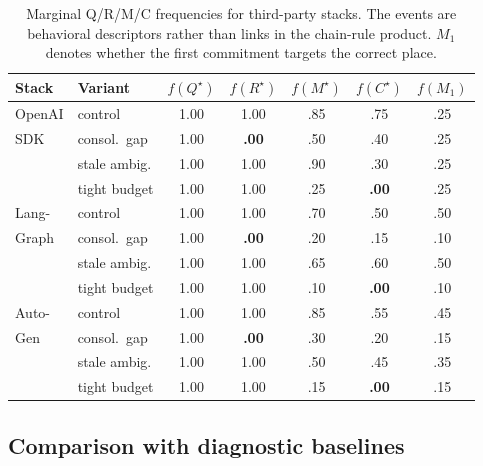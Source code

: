 \documentclass[letterpaper]{article}
\begin{document}
\begin{table}[h]
\caption{Marginal Q/R/M/C frequencies for third-party stacks. The events are behavioral descriptors rather than links in the chain-rule product. $M_1$ denotes whether the first commitment targets the correct place.}
\label{tab:external}
\centering
\small
\setlength{\tabcolsep}{3.4pt}
\begin{tabular}{llccccc}
\toprule
Stack & Variant & $f(Q^\star)$ & $f(R^\star)$ & $f(M^\star)$ & $f(C^\star)$ & $f(M_1)$ \\
\midrule
OpenAI & control      & 1.00 & 1.00 & .85 & .75 & .25 \\
SDK    & consol.\ gap & 1.00 & \textbf{.00} & .50 & .40 & .25 \\
       & stale ambig. & 1.00 & 1.00 & .90 & .30 & .25 \\
       & tight budget & 1.00 & 1.00 & .25 & \textbf{.00} & .25 \\
\midrule
Lang-  & control      & 1.00 & 1.00 & .70 & .50 & .50 \\
Graph  & consol.\ gap & 1.00 & \textbf{.00} & .20 & .15 & .10 \\
       & stale ambig. & 1.00 & 1.00 & .65 & .60 & .50 \\
       & tight budget & 1.00 & 1.00 & .10 & \textbf{.00} & .10 \\
\midrule
Auto-  & control      & 1.00 & 1.00 & .85 & .55 & .45 \\
Gen    & consol.\ gap & 1.00 & \textbf{.00} & .30 & .20 & .15 \\
       & stale ambig. & 1.00 & 1.00 & .50 & .45 & .35 \\
       & tight budget & 1.00 & 1.00 & .15 & \textbf{.00} & .15 \\
\bottomrule
\end{tabular}
\end{table}



\subsection{Comparison with diagnostic baselines}

\end{document}
